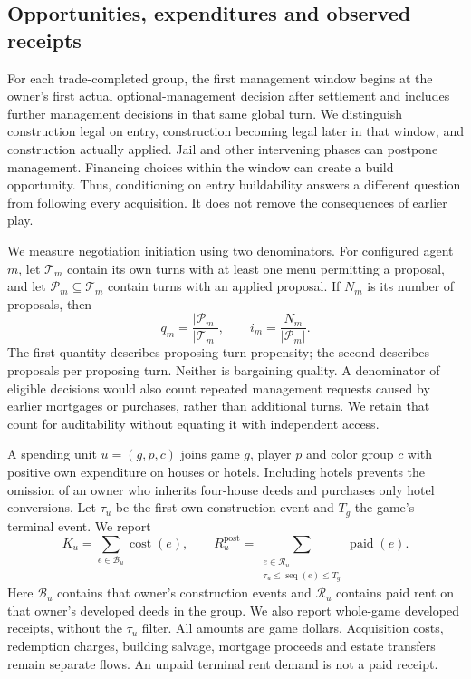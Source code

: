 \subsection{Opportunities, expenditures and observed receipts}

For each trade-completed group, the first management window begins at the owner's first actual optional-management decision after settlement and includes further management decisions in that same global turn. We distinguish construction legal on entry, construction becoming legal later in that window, and construction actually applied. Jail and other intervening phases can postpone management. Financing choices within the window can create a build opportunity. Thus, conditioning on entry buildability answers a different question from following every acquisition. It does not remove the consequences of earlier play.

We measure negotiation initiation using two denominators. For configured agent $m$, let $\mathcal{T}_m$ contain its own turns with at least one menu permitting a proposal, and let $\mathcal{P}_m\subseteq\mathcal{T}_m$ contain turns with an applied proposal. If $N_m$ is its number of proposals, then
\begin{equation}
 q_m=\frac{|\mathcal{P}_m|}{|\mathcal{T}_m|},
 \qquad
 i_m=\frac{N_m}{|\mathcal{P}_m|}.
 \label{eq:sol-proposals}
\end{equation}
The first quantity describes proposing-turn propensity; the second describes proposals per proposing turn. Neither is bargaining quality. A denominator of eligible decisions would also count repeated management requests caused by earlier mortgages or purchases, rather than additional turns. We retain that count for auditability without equating it with independent access.

A spending unit $u=(g,p,c)$ joins game $g$, player $p$ and color group $c$ with positive own expenditure on houses or hotels. Including hotels prevents the omission of an owner who inherits four-house deeds and purchases only hotel conversions. Let $\tau_u$ be the first own construction event and $T_g$ the game's terminal event. We report
\begin{equation}
 K_u=\sum_{e\in\mathcal{B}_u}\operatorname{cost}(e),
 \qquad
 R_u^{\mathrm{post}}=
 \sum_{\substack{e\in\mathcal{R}_u\\\tau_u\leq\operatorname{seq}(e)\leq T_g}}
 \operatorname{paid}(e).
 \label{eq:sol-receipts}
\end{equation}
Here $\mathcal{B}_u$ contains that owner's construction events and $\mathcal{R}_u$ contains paid rent on that owner's developed deeds in the group. We also report whole-game developed receipts, without the $\tau_u$ filter. All amounts are game dollars. Acquisition costs, redemption charges, building salvage, mortgage proceeds and estate transfers remain separate flows. An unpaid terminal rent demand is not a paid receipt.

